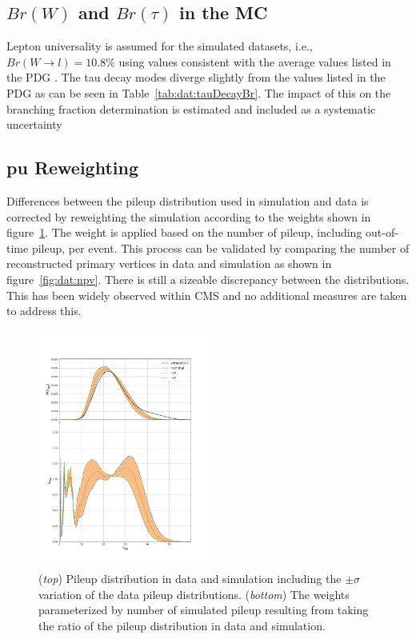 

\subsection{$Br(W)$ and $Br(\tau)$ in the MC}
Lepton universality is assumed for the simulated datasets, i.e., $ Br(W\to l) = 10.8\%$ using values consistent with the average values listed in the PDG \cite{exhep:pdg:Patrignani:2016xqp}.  The tau decay modes diverge slightly from the values listed in the PDG as can be seen in Table~\ref{tab:dat:tauDecayBr}.  The impact of this on the branching fraction determination is estimated and included as a systematic uncertainty



\subsection{\acrfull{pu} Reweighting}

Differences between the pileup distribution used in simulation and data is corrected by reweighting the simulation according to the weights shown in figure~\ref{fig:dat:pileup}. The weight is applied based on the number of pileup, including out-of-time pileup, per event.  This process can be validated by comparing the number of reconstructed primary vertices in data and simulation as shown in figure~\ref{fig:dat:npv}. There is still a sizeable discrepancy between the distributions. This has been widely observed within CMS and no additional measures are taken to address this.


\begin{figure}[ht]
    \centering
    \includegraphics[width=0.5\textwidth]{chapters/3_dataAndSimulation/figures/pileup_systematics.pdf}
    \caption{(\emph{top}) Pileup distribution in data and simulation including the $\pm\sigma$ variation of the data pileup distributions. (\emph{bottom}) The weights parameterized by number of simulated pileup resulting from taking the ratio of the pileup distribution in data and simulation.}
    \label{fig:dat:pileup}
\end{figure}

